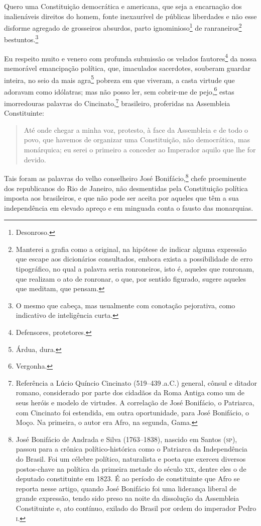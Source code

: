 Quero uma Constituição democrática e americana, que seja a encarnação
dos inalienáveis direitos do homem, fonte inexaurível de públicas
liberdades e não esse disforme agregado de grosseiros absurdos, parto
ignominioso\footnote{Desonroso.} de ranraneiros\footnote{Manterei a
  grafia como a original, na hipótese de indicar alguma expressão que
  escape aos dicionários consultados, embora exista a possibilidade de
  erro tipográfico, no qual a palavra seria ronroneiros, isto é, aqueles
  que ronronam, que realizam o ato de ronronar, o que, por sentido
  figurado, sugere aqueles que meditam, que pensam.}
bestuntos.\footnote{O mesmo que cabeça, mas usualmente com conotação
  pejorativa, como indicativo de inteligência curta.}

Eu respeito muito e venero com profunda submissão os velados
fautores\footnote{Defensores, protetores.} da nossa memorável
emancipação política, que, imaculados sacerdotes, souberam guardar
inteira, no seio da mais agra\footnote{Árdua, dura.} pobreza em que
viveram, a casta virtude que adoravam como idólatras; mas não posso ler,
sem cobrir-me de pejo,\footnote{Vergonha.} estas imorredouras palavras
do Cincinato,\footnote{Referência a Lúcio Quíncio Cincinato (519--439\,.a.C.) general, cônsul e ditador romano, considerado por parte
  dos cidadãos da Roma Antiga como um de seus heróis e modelo de
  virtudes. A correlação de José Bonifácio, o Patriarca, com Cincinato
  foi estendida, em outra oportunidade, para José Bonifácio, o Moço. Na
  primeira, o autor era Afro, na segunda, Gama.}
brasileiro, proferidas na Assembleia Constituinte:


\begin{quote}
Até onde chegar a minha voz, protesto, à face da Assembleia e de todo o
povo, que havemos de organizar uma Constituição, não democrática, mas
monárquica; eu serei o primeiro a conceder ao Imperador aquilo que lhe
for devido.
\end{quote}

Tais foram as palavras do velho conselheiro José Bonifácio,\footnote{
  José Bonifácio de Andrada e Silva (1763--1838), nascido em Santos (\textsc{sp}),
  passou para a crônica político-histórica como o Patriarca da
  Independência do Brasil. Foi um célebre político, naturalista e poeta
  que exerceu diversos postos-chave na política da primeira metade do
  século \textsc{xix}, dentre eles o de deputado constituinte em 1823.\label{bonifacio} 
  É ao período de constituinte que Afro se reporta nesse artigo,
  quando José Bonifácio foi uma liderança liberal de grande expressão,
  tendo sido preso na noite da dissolução da Assembleia Constituinte e,
  ato contínuo, exilado do Brasil por ordem do imperador Pedro \textsc{i}.}
chefe proeminente dos republicanos do Rio de Janeiro, não desmentidas
pela Constituição política imposta aos brasileiros, e que não pode ser
aceita por aqueles que têm a sua independência em elevado apreço e em
minguada conta o fausto das monarquias.

